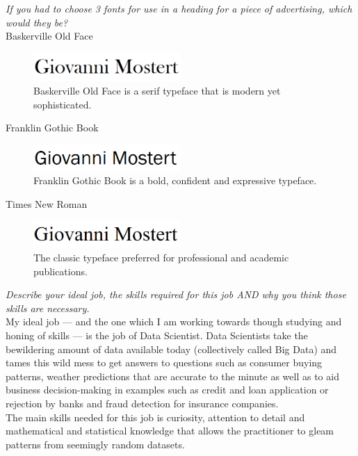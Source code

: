 \documentclass[a4paper,12pt]{article}
\begin{document}
\vspace*{1.2cm}

\textit{If you had to choose 3 fonts for use in a heading for a piece of advertising, which would they be?}
\\

\setlength{\parindent}{10ex}
Baskerville Old Face
\begin{figure}[h]
\centering
\includegraphics[width=0.5\textwidth]{font-1-baskerville.png}
\caption{Baskerville Old Face is a serif typeface that is modern yet sophisticated.}
\end{figure}
\noindent %

\newpage

\setlength{\parindent}{10ex}
Franklin Gothic Book
\begin{figure}[h]
\centering
\includegraphics[width=0.5\textwidth]{font-2-franklin.png}
\caption{Franklin Gothic Book is a bold, confident and expressive typeface.}
\end{figure}
\noindent %

\setlength{\parindent}{10ex}
Times New Roman
\begin{figure}[h]
\centering
\includegraphics[width=0.5\textwidth]{font-3-tnr.png}
\caption{The classic typeface preferred for professional and academic publications.}
\end{figure}

\noindent %
\textit{Describe your ideal job, the skills required for this job AND why you think those skills are necessary.}\\
My ideal job --- and the one which I am working towards though studying and honing of skills --- is the job of Data Scientist. Data Scientists take the bewildering amount of data available today (collectively called Big Data) and tames this wild mess to get answers to questions such as consumer buying patterns, weather predictions that are accurate to the minute as well as to aid business decision-making in examples such as credit and loan application or rejection by banks and fraud detection for insurance companies.\\
The main skills needed for this job is curiosity, attention to detail and mathematical and statistical knowledge that allows the practitioner to gleam patterns from seemingly random datasets.
\vspace*{0.01cm}
\\
\end{document}
